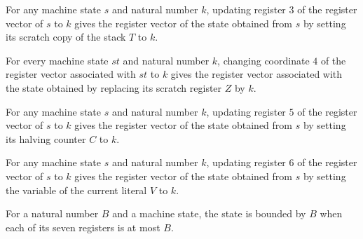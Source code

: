 \begin{lemma}
\label{Complexity.LogProg.TQBFARM.St.upd_T}
\leanok
{}
For any machine state $s$ and natural number $k$, updating register $3$ of the register
vector of $s$ to $k$ gives the register vector of the state obtained from $s$ by setting
its scratch copy of the stack $T$ to $k$.
\end{lemma}

\begin{lemma}
\label{Complexity.LogProg.TQBFARM.St.upd_Z}
\leanok
{}
For every machine state $st$ and natural number $k$, changing coordinate $4$ of the
register vector associated with $st$ to $k$ gives the register vector associated with
the state obtained by replacing its scratch register $Z$ by $k$.
\end{lemma}

\begin{lemma}
\label{Complexity.LogProg.TQBFARM.St.upd_C}
\leanok
{}
For any machine state $s$ and natural number $k$, updating register $5$ of the register
vector of $s$ to $k$ gives the register vector of the state obtained from $s$ by setting
its halving counter $C$ to $k$.
\end{lemma}

\begin{lemma}
\label{Complexity.LogProg.TQBFARM.St.upd_V}
\leanok
{}
For any machine state $s$ and natural number $k$, updating register $6$ of the register
vector of $s$ to $k$ gives the register vector of the state obtained from $s$ by setting
the variable of the current literal $V$ to $k$.
\end{lemma}

\begin{definition}
\label{Complexity.LogProg.TQBFARM.St.Bd}
\leanok
{}
For a natural number $B$ and a machine state, the state is bounded by $B$ when each of
its seven registers is at most $B$.
\end{definition}

